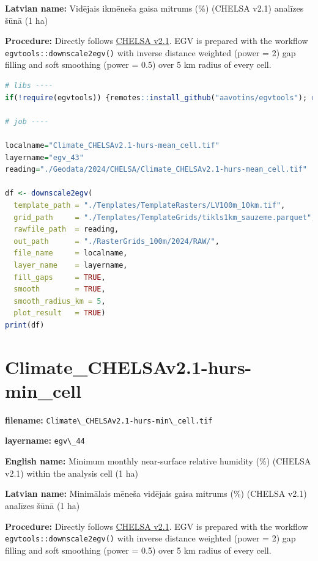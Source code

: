 \documentclass[
]{book}
\newcommand{\passthrough}[1]{#1}
\begin{document}
\textbf{Latvian name:} Vidējais ikmēneša gaisa mitrums (\%) (CHELSA v2.1) analīzes šūnā (1 ha)

\textbf{Procedure:} Directly follows \hyperref[Ch04.11]{CHELSA v2.1}. EGV is prepared with the
workflow \passthrough{\lstinline!egvtools::downscale2egv()!} with inverse distance weighted (power = 2)
gap filling and soft smoothing (power = 0.5) over 5 km radius of every cell.

\begin{lstlisting}[language=R]
# libs ----
if(!require(egvtools)) {remotes::install_github("aavotins/egvtools"); require(egvtools)}

# job ----

localname="Climate_CHELSAv2.1-hurs-mean_cell.tif"
layername="egv_43"
reading="./Geodata/2024/CHELSA/Climate_CHELSAv2.1-hurs-mean_cell.tif"

df <- downscale2egv(
  template_path = "./Templates/TemplateRasters/LV100m_10km.tif",
  grid_path     = "./Templates/TemplateGrids/tikls1km_sauzeme.parquet",
  rawfile_path  = reading,
  out_path      = "./RasterGrids_100m/2024/RAW/",
  file_name     = localname,
  layer_name    = layername,
  fill_gaps     = TRUE,
  smooth        = TRUE,
  smooth_radius_km = 5,
  plot_result   = TRUE)
print(df)
\end{lstlisting}

\section{Climate\_CHELSAv2.1-hurs-min\_cell}\label{ch06.044}

\textbf{filename:} \passthrough{\lstinline!Climate\_CHELSAv2.1-hurs-min\_cell.tif!}

\textbf{layername:} \passthrough{\lstinline!egv\_44!}

\textbf{English name:} Minimum monthly near-surface relative humidity (\%) (CHELSA v2.1) within the analysis cell (1 ha)

\textbf{Latvian name:} Minimālais mēneša vidējais gaisa mitrums (\%) (CHELSA v2.1) analīzes šūnā (1 ha)

\textbf{Procedure:} Directly follows \hyperref[Ch04.11]{CHELSA v2.1}. EGV is prepared with the
workflow \passthrough{\lstinline!egvtools::downscale2egv()!} with inverse distance weighted (power = 2)
gap filling and soft smoothing (power = 0.5) over 5 km radius of every cell.
\end{document}
